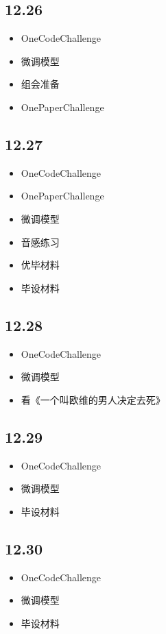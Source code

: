 \documentclass[UTF8]{ctexart}
\begin{document}
\subsection*{12.26}
\begin{itemize}
    \item OneCodeChallenge
    \item 微调模型
    \item 组会准备
    \item OnePaperChallenge
\end{itemize}

\subsection*{12.27}
\begin{itemize}
    \item OneCodeChallenge
    \item OnePaperChallenge
    \item 微调模型
    \item 音感练习
    \item 优毕材料
    \item 毕设材料
\end{itemize}

\subsection*{12.28}
\begin{itemize}
    \item OneCodeChallenge
    \item 微调模型
    \item 看《一个叫欧维的男人决定去死》
\end{itemize}

\subsection*{12.29}
\begin{itemize}
    \item OneCodeChallenge
    \item 微调模型
    \item 毕设材料
\end{itemize}

\subsection*{12.30}
\begin{itemize}
    \item OneCodeChallenge
    \item 微调模型
    \item 毕设材料
\end{itemize}
\end{document}
